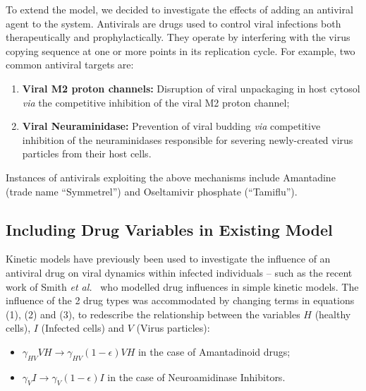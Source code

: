 \documentclass[a4paper, 12pt]{report}
\begin{document}
To extend the model, we decided to investigate the effects of adding an antiviral agent to the system.
Antivirals are drugs used to control viral infections both therapeutically and prophylactically. They operate by interfering with the virus copying sequence at one or more points in its replication cycle. For example, two common antiviral targets are:
\begin{enumerate}
\item \textbf{Viral M2 proton channels:} Disruption of viral unpackaging in host cytosol \textit{via} the competitive inhibition of the viral M2 proton channel;~\cite{Hu}
\item \textbf{Viral Neuraminidase:} Prevention of viral budding \textit{via} competitive inhibition of the neuraminidases responsible for severing newly-created virus particles from their host cells.\cite{Satoh}  
\end{enumerate}
Instances of antivirals exploiting the above mechanisms include  Amantadine (trade name ``Symmetrel'') and Oseltamivir phosphate (``Tamiflu'').\\

\subsection{Including Drug Variables in Existing Model}

Kinetic models have previously been used to investigate the influence of an antiviral drug on viral dynamics within infected individuals -- such as the recent work of Smith \textit{et al.}~\cite{Smith} who modelled drug influences in simple kinetic models.
The influence of the 2 drug types was accommodated by changing terms in equations (1), (2) and (3), to redescribe the relationship between the variables $H$ (healthy cells), $I$ (Infected cells) and $V$ (Virus particles):

\begin{itemize}
\item  $\gamma_{HV}VH \rightarrow \gamma_{HV}(1 - \epsilon)VH$ in the case of Amantadinoid drugs;
\item $\gamma_{V}I \rightarrow \gamma_{V}(1 - \epsilon)I $ in the case of Neuroamidinase Inhibitors.
\end{itemize}
\end{document}
